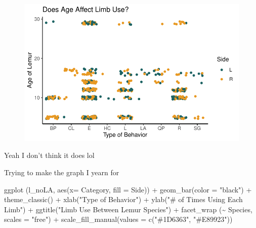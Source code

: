\documentclass[
  letterpaper,
  DIV=11,
  numbers=noendperiod]{scrartcl}
\newenvironment{Shaded}{\begin{snugshade}}{\end{snugshade}}
\newcommand{\AttributeTok}[1]{\textcolor[rgb]{0.40,0.45,0.13}{#1}}
\newcommand{\FunctionTok}[1]{\textcolor[rgb]{0.28,0.35,0.67}{#1}}
\newcommand{\NormalTok}[1]{\textcolor[rgb]{0.00,0.23,0.31}{#1}}
\newcommand{\SpecialCharTok}[1]{\textcolor[rgb]{0.37,0.37,0.37}{#1}}
\newcommand{\StringTok}[1]{\textcolor[rgb]{0.13,0.47,0.30}{#1}}
\begin{document}
\begin{figure}[H]

{\centering \includegraphics{LeftyLemurs_files/figure-pdf/unnamed-chunk-45-1.pdf}

}

\end{figure}

Yeah I don't think it does lol

Trying to make the graph I yearn for

\begin{Shaded}
\begin{Highlighting}[]
\FunctionTok{ggplot}\NormalTok{ (l\_noLA, }\FunctionTok{aes}\NormalTok{(}\AttributeTok{x=}\NormalTok{ Category, }\AttributeTok{fill =}\NormalTok{ Side)) }\SpecialCharTok{+}
  \FunctionTok{geom\_bar}\NormalTok{(}\AttributeTok{color =} \StringTok{"black"}\NormalTok{) }\SpecialCharTok{+}
  \FunctionTok{theme\_classic}\NormalTok{() }\SpecialCharTok{+}
  \FunctionTok{xlab}\NormalTok{(}\StringTok{"Type of Behavior"}\NormalTok{) }\SpecialCharTok{+}
  \FunctionTok{ylab}\NormalTok{(}\StringTok{"\# of Times Using Each Limb"}\NormalTok{) }\SpecialCharTok{+}
  \FunctionTok{ggtitle}\NormalTok{(}\StringTok{"Limb Use Between Lemur Species"}\NormalTok{) }\SpecialCharTok{+}
  \FunctionTok{facet\_wrap}\NormalTok{ (}\SpecialCharTok{\textasciitilde{}}\NormalTok{ Species, }\AttributeTok{scales =} \StringTok{"free"}\NormalTok{) }\SpecialCharTok{+} 
  \FunctionTok{scale\_fill\_manual}\NormalTok{(}\AttributeTok{values =} \FunctionTok{c}\NormalTok{(}\StringTok{"\#1D6363"}\NormalTok{, }\StringTok{"\#E89923"}\NormalTok{))}
\end{Highlighting}
\end{Shaded}
\end{document}
